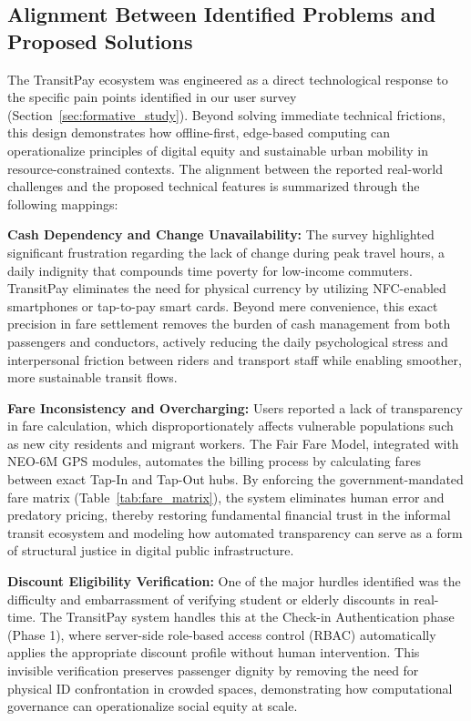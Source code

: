 \documentclass[manuscript,review,anonymous]{acmart}
\begin{document}
\subsection{Alignment Between Identified Problems and Proposed Solutions}
The TransitPay ecosystem was engineered as a direct technological response to the specific pain points identified in our user survey (Section~\ref{sec:formative_study}). Beyond solving immediate technical frictions, this design demonstrates how offline-first, edge-based computing can operationalize principles of digital equity and sustainable urban mobility in resource-constrained contexts. The alignment between the reported real-world challenges and the proposed technical features is summarized through the following mappings:

\textbf{Cash Dependency and Change Unavailability:} The survey highlighted significant frustration regarding the lack of change during peak travel hours, a daily indignity that compounds time poverty for low-income commuters. TransitPay eliminates the need for physical currency by utilizing NFC-enabled smartphones or tap-to-pay smart cards. Beyond mere convenience, this exact precision in fare settlement removes the burden of cash management from both passengers and conductors, actively reducing the daily psychological stress and interpersonal friction between riders and transport staff while enabling smoother, more sustainable transit flows.

\textbf{Fare Inconsistency and Overcharging:} Users reported a lack of transparency in fare calculation, which disproportionately affects vulnerable populations such as new city residents and migrant workers. The Fair Fare Model, integrated with NEO-6M GPS modules, automates the billing process by calculating fares between exact Tap-In and Tap-Out hubs. By enforcing the government-mandated fare matrix (Table~\ref{tab:fare_matrix}), the system eliminates human error and predatory pricing, thereby restoring fundamental financial trust in the informal transit ecosystem and modeling how automated transparency can serve as a form of structural justice in digital public infrastructure.

\textbf{Discount Eligibility Verification:} One of the major hurdles identified was the difficulty and embarrassment of verifying student or elderly discounts in real-time. The TransitPay system handles this at the Check-in Authentication phase (Phase 1), where server-side role-based access control (RBAC) automatically applies the appropriate discount profile without human intervention. This invisible verification preserves passenger dignity by removing the need for physical ID confrontation in crowded spaces, demonstrating how computational governance can operationalize social equity at scale.
\end{document}
